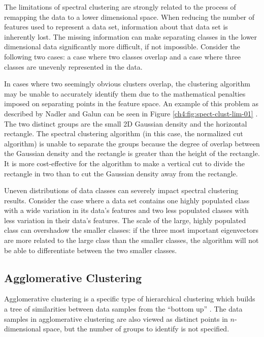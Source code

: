 The limitations of spectral clustering are strongly related to the process of remapping the data to a lower dimensional space.  When reducing the number of features used to represent a data set, information about that data set is inherently lost. The missing information can make separating classes in the lower dimensional data significantly more difficult, if not impossible. Consider the following two cases: a case where two classes overlap and a case where three classes are unevenly represented in the data.

In cases where two seemingly obvious clusters overlap, the clustering algorithm may be unable to accurately identify them due to the mathematical penalties imposed on separating points in the feature space. An example of this problem as described by Nadler and Galun can be seen in Figure \ref{ch4:fig:spect-clust-lim-01} \cite{Nadler2007}. The two distinct groups are the small 2D Gaussian density and the horizontal rectangle. The spectral clustering algorithm (in this case, the normalized cut algorithm) is unable to separate the groups because the degree of overlap between the Gaussian density and the rectangle is greater than the height of the rectangle. It is more cost-effective for the algorithm to make a vertical cut to divide the rectangle in two than to cut the Gaussian density away from the rectangle.

Uneven distributions of data classes can severely impact spectral clustering results. Consider the case where a data set contains one highly populated class with a wide variation in its data's features and two less populated classes with less variation in their data's features. The scale of the large, highly populated class can overshadow the smaller classes: if the three most important eigenvectors are more related to the large class than the smaller classes, the algorithm will not be able to differentiate between the two smaller classes.

\subsection{Agglomerative Clustering}

Agglomerative clustering is a specific type of hierarchical clustering which builds a tree of similarities between data samples from the ``bottom up'' \cite{Ward1963}. The data samples in agglomerative clustering are also viewed as distinct points in $n$-dimensional space, but the number of groups to identify is not specified. 

